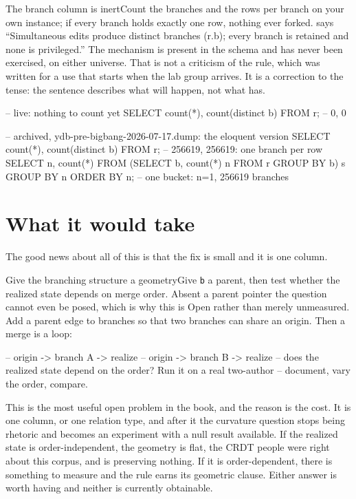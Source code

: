 \begin{Correspondence}{The branch column is inert}{Count the branches and the rows per branch on your own instance; if every branch holds exactly one row, nothing ever forked.}
 says ``Simultaneous edits produce distinct branches (r.b); every branch is retained and none is privileged.'' The mechanism is present in the schema and has never been exercised, on either universe. That is not a criticism of the rule, which was written for a use that starts when the lab group arrives. It is a correction to the tense: the sentence describes what will happen, not what has.
\begin{Check}
-- live: nothing to count yet
SELECT count(*), count(distinct b) FROM r;           -- 0, 0

-- archived, ydb-pre-bigbang-2026-07-17.dump: the eloquent version
SELECT count(*), count(distinct b) FROM r;           -- 256619, 256619: one branch per row
SELECT n, count(*) FROM (SELECT b, count(*) n FROM r GROUP BY b) s
  GROUP BY n ORDER BY n;                             -- one bucket: n=1, 256619 branches
\end{Check}
\end{Correspondence}

\section{What it would take}

The good news about all of this is that the fix is small and it is one column.

\begin{Open}{Give the branching structure a geometry}{Give \texttt{b} a parent, then test whether the realized state depends on merge order.}
Absent a parent pointer the question cannot even be posed, which is why this is Open rather than merely unmeasured. Add a parent edge to branches so that two branches can share an origin. Then a merge is a loop:

\begin{Check}
-- origin -> branch A -> realize
-- origin -> branch B -> realize
-- does the realized state depend on the order? Run it on a real two-author
-- document, vary the order, compare.
\end{Check}
This is the most useful open problem in the book, and the reason is the cost. It is one column, or one relation type, and after it the curvature question stops being rhetoric and becomes an experiment with a null result available. If the realized state is order-independent, the geometry is flat, the CRDT people were right about this corpus, and  is preserving nothing. If it is order-dependent, there is something to measure and the rule earns its geometric clause. Either answer is worth having and neither is currently obtainable.
\end{Open}

